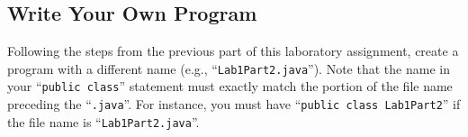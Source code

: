 


\vspace*{-.15in}
\subsection*{Write Your Own Program}
\vspace*{-.05in}

Following the steps from the previous part of this laboratory assignment, create a program with a different name (e.g.,
``{\tt Lab1Part2.java}''). Note that the name in your ``{\tt public class}'' statement must exactly match the portion of
the file name preceding the ``{\tt .java}''.  For instance, you must have ``{\tt public class Lab1Part2}'' if the file
name is ``{\tt Lab1Part2.java}''.

